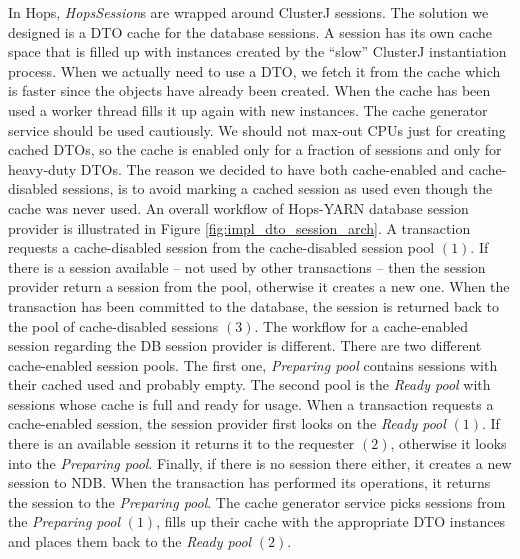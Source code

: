 In Hops, \emph{HopsSession}s are wrapped around ClusterJ sessions. The
solution we designed is a DTO cache for the database sessions.
A session has its own cache space that is filled
up with instances created by the ``slow'' ClusterJ instantiation
process. When we actually need to use a DTO, we fetch it from
the cache which is faster since the objects have already been
created. When the cache has been used a worker thread fills it up
again with new instances. The cache generator service should be used
cautiously. We should not max-out CPUs just for creating cached DTOs, so the
cache is enabled only for a fraction of sessions and only for
heavy-duty DTOs. The reason we decided to have both cache-enabled
and cache-disabled sessions, is to avoid marking a cached session as
used even though the cache was never used. An overall workflow 
of Hops-YARN database session provider
is illustrated in Figure \ref{fig:impl_dto_session_arch}. A
transaction requests a cache-disabled session from the cache-disabled
session pool $(1)$. If there is a session available -- not used by
other transactions -- then the session provider return a session from
the pool, otherwise it creates a new one. When the transaction has
been committed to the database, the session is returned back to the pool
of cache-disabled sessions $(3)$. The workflow for a cache-enabled
session regarding the DB session provider is
different. There are two different cache-enabled session
pools. The first one, \emph{Preparing pool} contains sessions with
their cached used and probably empty. The second pool is the
\emph{Ready pool} with sessions whose cache is full and ready for
usage. When a transaction requests a cache-enabled session, the session
provider first looks on the \emph{Ready pool} $(1)$. If there is an
available session it returns it to the requester $(2)$, otherwise it
looks into the \emph{Preparing pool}. Finally, if there is no session
there either, it creates a new session to NDB. When the transaction
has performed its operations, it returns the session to the
\emph{Preparing pool}. The cache generator service picks sessions from
the \emph{Preparing pool} $(1)$, fills up their cache with the appropriate
DTO instances and places them back to the \emph{Ready pool} $(2)$.

